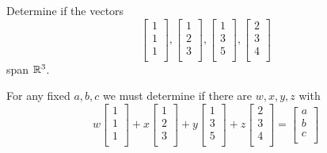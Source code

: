 \documentclass{article}
\begin{document}
\begin{example}
  Determine if the vectors
  \[
    \begin{bmatrix}
      1\\ 1\\ 1\\
    \end{bmatrix},
    \begin{bmatrix}
      1\\ 2\\ 3\\
    \end{bmatrix},
    \begin{bmatrix}
      1\\ 3\\ 5\\
    \end{bmatrix},
    \begin{bmatrix}
      2\\ 3\\ 4\\
    \end{bmatrix}
  \]
  span $\mathbb{R}^3$.

  For any fixed $a, b, c$ we must determine if there are $w, x, y, z$ with
  \[
    w
    \begin{bmatrix}
      1\\ 1\\ 1\\
    \end{bmatrix}+
    x
    \begin{bmatrix}
      1\\ 2\\ 3\\
    \end{bmatrix}+
    y
    \begin{bmatrix}
      1\\ 3\\ 5\\
    \end{bmatrix}+z
    \begin{bmatrix}
      2\\ 3\\ 4\\
    \end{bmatrix}
    =
    \begin{bmatrix}
      a\\b\\c\\
    \end{bmatrix}
  \]


\end{example}
\end{document}

